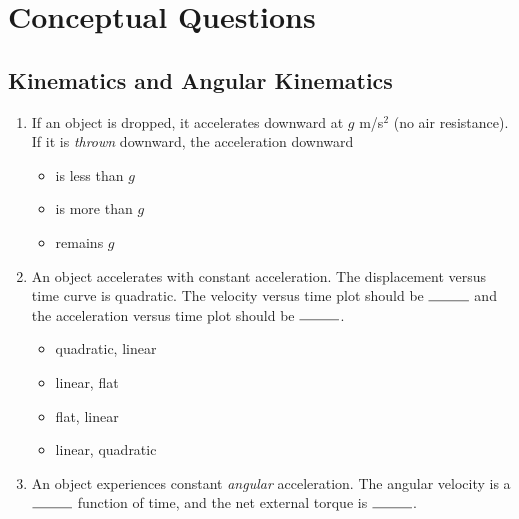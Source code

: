\documentclass[10pt]{article}
\begin{document}
\maketitle

\section{Conceptual Questions}
\subsection{Kinematics and Angular Kinematics}
\begin{enumerate}
\item If an object is dropped, it accelerates downward at $g$ m/s$^2$ (no air resistance).  If it is \textit{thrown} downward, the acceleration downward
\begin{itemize}
\item is less than $g$
\item is more than $g$
\item remains $g$
\end{itemize}
\item An object accelerates with constant acceleration.  The displacement versus time curve is quadratic.  The velocity versus time plot should be $\rule{1cm}{0.15mm}$ and the acceleration versus time plot should be $\rule{1cm}{0.15mm}$.
\begin{itemize}
\item quadratic, linear
\item linear, flat
\item flat, linear
\item linear, quadratic
\end{itemize}
\item An object experiences constant \textit{angular} acceleration.  The angular velocity is a $\rule{1cm}{0.15mm}$ function of time, and the net external torque is $\rule{1cm}{0.15mm}$.

\end{enumerate}
\end{document}
